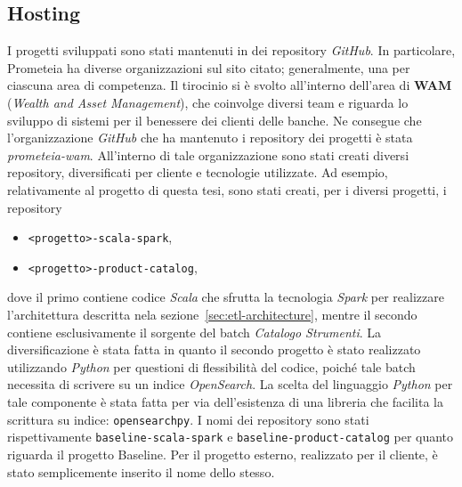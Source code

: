 \subsection{Hosting}\label{subsec:hosting}
I progetti sviluppati sono stati mantenuti in dei repository \textit{GitHub}.
In particolare, Prometeia ha diverse organizzazioni sul sito citato;
generalmente, una per ciascuna area di competenza.
Il tirocinio si è svolto all'interno dell'area di \textbf{WAM} (\textit{Wealth and Asset Management}), che coinvolge diversi team e riguarda lo sviluppo di sistemi per il benessere dei clienti delle banche.
Ne consegue che l'organizzazione \textit{GitHub} che ha mantenuto i repository dei progetti è stata \textit{prometeia-wam}.
All'interno di tale organizzazione sono stati creati diversi repository, diversificati per cliente e tecnologie utilizzate.
Ad esempio, relativamente al progetto di questa tesi, sono stati creati, per i diversi progetti, i repository
\begin{itemize}
    \item \texttt{<progetto>-scala-spark},
    \item \texttt{<progetto>-product-catalog},
\end{itemize}
dove il primo contiene codice \textit{Scala} che sfrutta la tecnologia \textit{Spark} per realizzare l'architettura descritta nela sezione~\ref{sec:etl-architecture}, mentre il secondo contiene esclusivamente il sorgente del batch \textit{Catalogo Strumenti}.
La diversificazione è stata fatta in quanto il secondo progetto è stato realizzato utilizzando \textit{Python} per questioni di flessibilità del codice, poiché tale batch necessita di scrivere su un indice \textit{OpenSearch}.
La scelta del linguaggio \textit{Python} per tale componente è stata fatta per via dell'esistenza di una libreria che facilita la scrittura su indice: \texttt{opensearchpy}.
I nomi dei repository sono stati rispettivamente \texttt{baseline-scala-spark} e \texttt{baseline-product-catalog} per quanto riguarda il progetto Baseline.
Per il progetto esterno, realizzato per il cliente, è stato semplicemente inserito il nome dello stesso.

